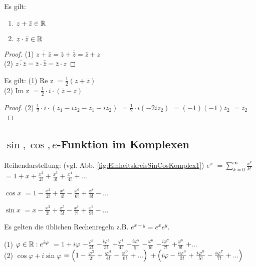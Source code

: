 Es gilt:
\begin{enumerate} 
\item $z + \bar z \in \mathbb{R}$
\item $z \cdot \bar z \in \mathbb{R}$
\end{enumerate}

\begin{proof}
(1) $\overline{z+\bar z} = \bar z + \bar{\bar z}=\bar z + z$\\
(2) $\overline{z\cdot \bar z} = \bar z \cdot  \bar{\bar z}=\bar z \cdot  z$
\end{proof}

Es gilt:
(1) Re z $=\frac{1}{2} (z+\bar z)$\\
(2) Im z $=\frac{1}{2} \cdot i \cdot (\bar z - z)$ 

\begin{proof}
(2) $\frac{1}{2} \cdot i \cdot (z_1 - i z_2 - z_1 - i z_2)$
$=\frac{1}{2} \cdot i (-2i z_2)$
$=(-1)(-1) z_2$
$=z_2$
\end{proof}

\subsection{$\sin, \cos, e$-Funktion im Komplexen}
Reihendarstellung: (vgl. Abb. \ref{fig:EinheitskreisSinCosKomplex1}) 
$e^x$
$=\sum_{k=0}^{\infty} \frac{x^k}{k!}$
$=1 + x + \frac{x^2}{2!} + \frac{x^3}{3!} + \frac{x^4}{4!}+ ...$

$\cos x$
$=1 - \frac{x^2}{2!} + \frac{x^4}{4!} - \frac{x^6}{6!} + \frac{x^8}{8!} - ...$

$\sin x$
$=x - \frac{x^3}{3!} + \frac{x^5}{5!} - \frac{x^7}{7!} + \frac{x^9}{9!} - ...$

Es gelten die üblichen Rechenregeln z.B. $e^{x+y} = e^x e^y$.
\renewcommand{\locpl}{i\varphi}

(1) $\varphi \in \R : e^{\locpl}$
$=1+\locpl$
$-\frac{\varphi^2}{2!}$
$-\frac{i \varphi^3}{3!}$
$+\frac{\varphi^4}{4!}$
$+\frac{i \varphi^5}{5!}$
$-\frac{\varphi^6}{6!}$
$-\frac{i \varphi^7}{7!}$
$+\frac{\varphi^8}{8!}$
$+...$\\

(2) $\cos \varphi + i \sin \varphi$
$= \left( 1 - \frac{\varphi^2}{2!} + \frac{\varphi^4}{4!} - \frac{\varphi^6}{6!} + ... \right) $
$+\rbr{\locpl - \frac{i \varphi^3}{3!} + \frac{i \varphi^5}{5!} - \frac{i \varphi^7}{7!} + ... }$

